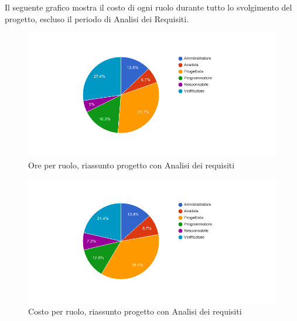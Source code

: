 Il seguente grafico mostra il costo di ogni ruolo durante tutto lo svolgimento del progetto, escluso il periodo di Analisi dei Requisiti.

\begin{figure}[H]
  \begin{center}
    \includegraphics[width=15cm]{res/img/prospettoEconomico/orePerRuoloRiassuntoConAnalisi.png}
  \caption{Ore per ruolo, riassunto progetto con Analisi dei requisiti}
  \end{center} 
\end{figure}  

\begin{figure}[H]
  \begin{center}
    \includegraphics[width=15cm]{res/img/prospettoEconomico/costoPerRuoloRiassuntoConAnalisi.png}
  \caption{Costo per ruolo, riassunto progetto con Analisi dei requisiti}
  \end{center} 
\end{figure}  


